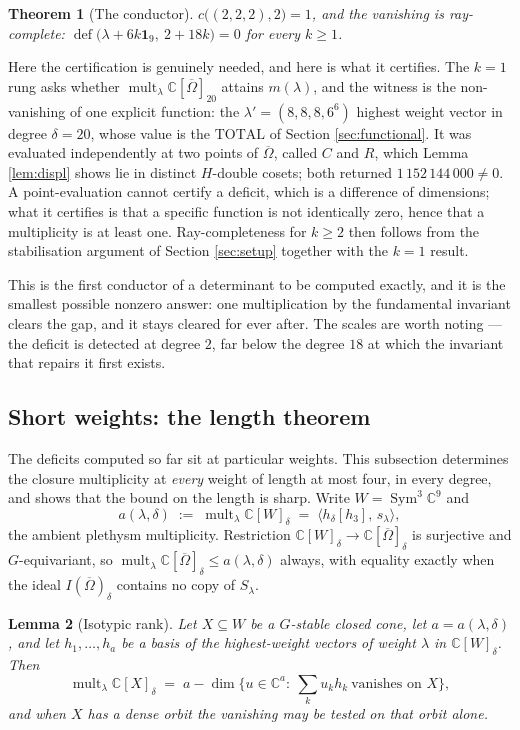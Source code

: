 \documentclass[11pt,reqno]{amsart}
\theoremstyle{plain}
\newtheorem{theorem}{Theorem}[section]
\newtheorem{lemma}[theorem]{Lemma}
\theoremstyle{definition}
\DeclareMathOperator{\Sym}{Sym}
\DeclareMathOperator{\mult}{mult}
\DeclareMathOperator{\dfc}{def}
\newcommand{\cO}{\overline{\Omega}}
\newcommand{\bC}{\mathbb{C}}
\begin{document}
\begin{theorem}[The conductor]\label{thm:detcond}
$c\big((2,2,2),2\big)=1$, and the vanishing is \emph{ray-complete}:
$\dfc\big(\lambda+6k\mathbf 1_9,\ 2+18k\big)=0$ for every $k\ge1$.
\end{theorem}

Here the certification is genuinely needed, and here is what it certifies.  The
$k=1$ rung asks whether $\mult_\lambda\bC[\cO]_{20}$ attains $m(\lambda)$, and
the witness is the non-vanishing of one explicit function: the
$\lambda'=(8,8,8,6^{6})$ highest weight vector in degree $\delta=20$, whose
value is the $\mathrm{TOTAL}$ of Section \ref{sec:functional}.  It was evaluated
independently at two points of $\cO$, called $C$ and $R$, which Lemma
\ref{lem:displ} shows lie in distinct $H$-double cosets; both returned
$1\,152\,144\,000\ne0$.  A point-evaluation cannot certify a deficit, which is a
difference of dimensions; what it certifies is that a specific function is not
identically zero, hence that a multiplicity is at least one.  Ray-completeness
for $k\ge2$ then follows from the stabilisation argument of Section
\ref{sec:setup} together with the $k=1$ result.

This is the first conductor of a determinant to be computed exactly, and it is
the smallest possible nonzero answer: one multiplication by the fundamental
invariant clears the gap, and it stays cleared for ever after.  The scales are
worth noting --- the deficit is detected at degree $2$, far below the degree
$18$ at which the invariant that repairs it first exists.

\subsection*{Short weights: the length theorem}

The deficits computed so far sit at particular weights.  This subsection
determines the closure multiplicity at \emph{every} weight of length at most
four, in every degree, and shows that the bound on the length is sharp.  Write
$W=\Sym^{3}\bC^{9}$ and
\[
  a(\lambda,\delta)\;:=\;\mult_\lambda\bC[W]_\delta
  \;=\;\langle h_\delta[h_3],\,s_\lambda\rangle ,
\]
the ambient plethysm multiplicity.  Restriction
$\bC[W]_\delta\to\bC[\cO]_\delta$ is surjective and $G$-equivariant, so
$\mult_\lambda\bC[\cO]_\delta\le a(\lambda,\delta)$ always, with equality
exactly when the ideal $I(\cO)_\delta$ contains no copy of $S_\lambda$.

\begin{lemma}[Isotypic rank]\label{lem:isorank}
Let $X\subseteq W$ be a $G$-stable closed cone, let $a=a(\lambda,\delta)$, and
let $h_1,\dots,h_a$ be a basis of the highest-weight vectors of weight
$\lambda$ in $\bC[W]_\delta$.  Then
\[
  \mult_\lambda\bC[X]_\delta\;=\;a-\dim\Big\{u\in\bC^{a}:\ \textstyle\sum_k
  u_kh_k\ \text{vanishes on }X\Big\} ,
\]
and when $X$ has a dense orbit the vanishing may be tested on that orbit alone.
\end{lemma}
\end{document}
